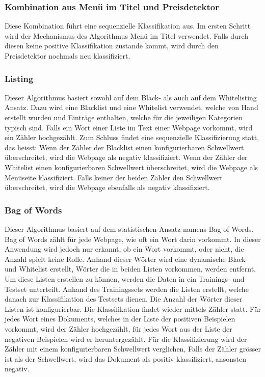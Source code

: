\subsubsection{Kombination aus Menü im Titel und Preisdetektor}
Diese Kombination führt eine sequenzielle Klassifikation aus.
Im ersten Schritt wird der Mechanismus des Algorithmus \glqq Menü im Titel \grqq verwendet.
Falls durch diesen keine positive Klassifikation zustande kommt, wird durch den Preisdetektor nochmals neu klassifiziert.
\subsubsection{Listing}
Dieser Algorithmus basiert sowohl auf dem Black- als auch auf dem Whitelisting Ansatz.
Dazu wird eine Blacklist und eine Whitelist verwendet, welche von Hand erstellt wurden und Einträge enthalten, welche für die jeweiligen Kategorien typisch sind.
Falls ein Wort einer Liste im Text einer Webpage vorkommt, wird ein Zähler hochgezählt.
Zum Schluss findet eine sequenzielle Klassifizierung statt, das heisst: 
Wenn der Zähler der Blacklist einen konfigurierbaren Schwellwert überschreitet, wird die Webpage als negativ klassifiziert. 
Wenn der Zähler der Whitelist einen konfigurierbaren Schwellwert überschreitet, wird die Webpage als Menüseite klassifiziert.
Falls keiner der beiden Zähler den Schwellwert überschreitet, wird die Webpage ebenfalls als negativ klassifiziert. 
\subsubsection{Bag of Words}\label{sec:bow}
Dieser Algorithmus basiert auf dem statistischen Ansatz namens \glqq Bag of Words\grqq.
Bag of Words zählt für jede Webpage, wie oft ein Wort darin vorkommt.
In dieser Anwendung wird jedoch nur erkannt, ob ein Wort vorkommt, oder nicht, die Anzahl spielt keine Rolle.
Anhand dieser Wörter wird eine dynamische Black- und Whitelist erstellt, Wörter die in beiden Listen vorkommen, werden entfernt.
Um diese Listen erstellen zu können, werden die Daten in ein Trainings- und Testset unterteilt.
Anhand des Trainingssets werden die Listen erstellt, welche danach zur Klassifikation des Testsets dienen.
Die Anzahl der Wörter dieser Listen ist konfigurierbar.
Die Klassifikation findet wieder mittels Zähler statt.
Für jedes Wort eines Dokuments, welches in der Liste der positiven Beispielen vorkommt, wird der Zähler hochgezählt, für jedes Wort aus der Liste der negativen Beispielen wird er heruntergezählt.
Für die Klassifizierung wird der Zähler mit einem konfigurierbaren Schwellwert verglichen, Falls der Zähler grösser ist als der Schwellwert, wird das Dokument als positiv klassifiziert, ansonsten negativ.

